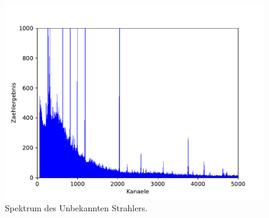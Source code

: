 \begin{figure}
  \centering
  \includegraphics[width=\textwidth]{python/plots/spec4}
  \caption{Spektrum des Unbekannten Strahlers.}
  \label{fig:spectrum_4}
\end{figure}




